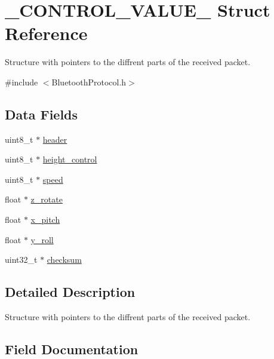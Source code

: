 \hypertarget{struct___c_o_n_t_r_o_l___v_a_l_u_e__}{}\section{\+\_\+\+C\+O\+N\+T\+R\+O\+L\+\_\+\+V\+A\+L\+U\+E\+\_\+ Struct Reference}
\label{struct___c_o_n_t_r_o_l___v_a_l_u_e__}


Structure with pointers to the diffrent parts of the received packet.  




{\ttfamily \#include $<$Bluetooth\+Protocol.\+h$>$}

\subsection*{Data Fields}
\begin{DoxyCompactItemize}
\item 
uint8\+\_\+t $\ast$ \hyperlink{struct___c_o_n_t_r_o_l___v_a_l_u_e___aa63570b28bd5f2f9c1ae97bc48e5cd1a}{header}
\item 
uint8\+\_\+t $\ast$ \hyperlink{struct___c_o_n_t_r_o_l___v_a_l_u_e___add038a2b5a3ad222bc862f96aa133236}{height\+\_\+control}
\item 
uint8\+\_\+t $\ast$ \hyperlink{struct___c_o_n_t_r_o_l___v_a_l_u_e___afab7215dd85272e54c54d59e78e865d8}{speed}
\item 
float $\ast$ \hyperlink{struct___c_o_n_t_r_o_l___v_a_l_u_e___ab31b08cbe82159ccf182a784cd6e395d}{z\+\_\+rotate}
\item 
float $\ast$ \hyperlink{struct___c_o_n_t_r_o_l___v_a_l_u_e___a86ebefe208904bd4f58d8c7306dd9f16}{x\+\_\+pitch}
\item 
float $\ast$ \hyperlink{struct___c_o_n_t_r_o_l___v_a_l_u_e___a2f8a834c72db81f047ea707ff307cf1d}{y\+\_\+roll}
\item 
uint32\+\_\+t $\ast$ \hyperlink{struct___c_o_n_t_r_o_l___v_a_l_u_e___a68d00127e4faee90889365d11480449a}{checksum}
\end{DoxyCompactItemize}


\subsection{Detailed Description}
Structure with pointers to the diffrent parts of the received packet. 

\subsection{Field Documentation}
